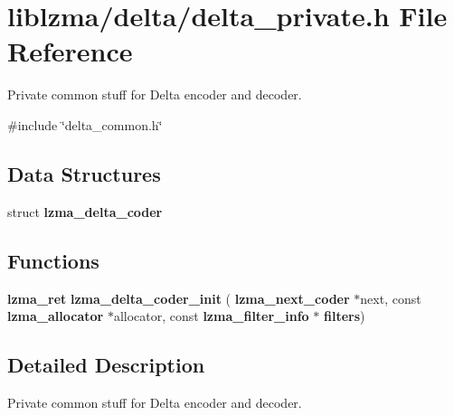 \section{liblzma/delta/delta\+\_\+private.h File Reference}
\label{delta__private_8h}


Private common stuff for Delta encoder and decoder.  


{\ttfamily \#include \char`\"{}delta\+\_\+common.\+h\char`\"{}}\newline
\subsection*{Data Structures}
\begin{DoxyCompactItemize}
\item 
struct \textbf{ lzma\+\_\+delta\+\_\+coder}
\end{DoxyCompactItemize}
\subsection*{Functions}
\begin{DoxyCompactItemize}
\item 
\mbox{\label{delta__private_8h_ab2ddc82a7ee7b360fb22dd0612bc96e9}} 
\textbf{ lzma\+\_\+ret} {\bfseries lzma\+\_\+delta\+\_\+coder\+\_\+init} (\textbf{ lzma\+\_\+next\+\_\+coder} $\ast$next, const \textbf{ lzma\+\_\+allocator} $\ast$allocator, const \textbf{ lzma\+\_\+filter\+\_\+info} $\ast$\textbf{ filters})
\end{DoxyCompactItemize}


\subsection{Detailed Description}
Private common stuff for Delta encoder and decoder. 

